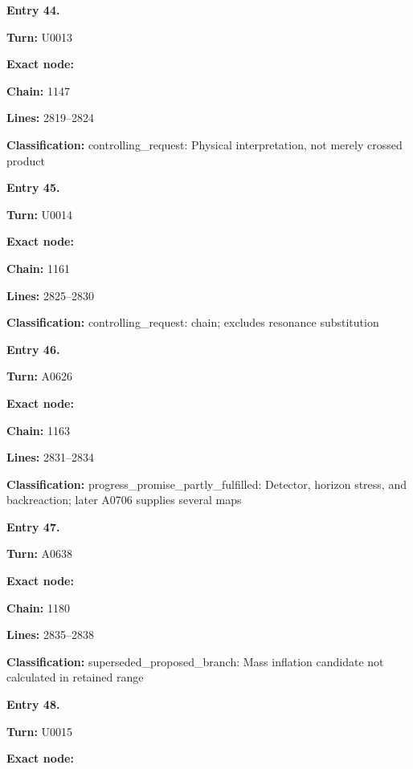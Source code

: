 \textbf{Entry 44.}

\textbf{Turn:} U0013

\textbf{Exact node:} \protect{}

\textbf{Chain:} 1147

\textbf{Lines:} 2819--2824

\textbf{Classification:} controlling\_request: Physical interpretation,
not merely crossed product


\textbf{Entry 45.}

\textbf{Turn:} U0014

\textbf{Exact node:} \protect{}

\textbf{Chain:} 1161

\textbf{Lines:} 2825--2830

\textbf{Classification:} controlling\_request:
\protect{} chain; excludes
resonance substitution


\textbf{Entry 46.}

\textbf{Turn:} A0626

\textbf{Exact node:} \protect{}

\textbf{Chain:} 1163

\textbf{Lines:} 2831--2834

\textbf{Classification:} progress\_promise\_partly\_fulfilled: Detector,
horizon stress, and backreaction; later A0706 supplies several maps


\textbf{Entry 47.}

\textbf{Turn:} A0638

\textbf{Exact node:} \protect{}

\textbf{Chain:} 1180

\textbf{Lines:} 2835--2838

\textbf{Classification:} superseded\_proposed\_branch: Mass inflation
candidate not calculated in retained range


\textbf{Entry 48.}

\textbf{Turn:} U0015

\textbf{Exact node:} \protect{}

